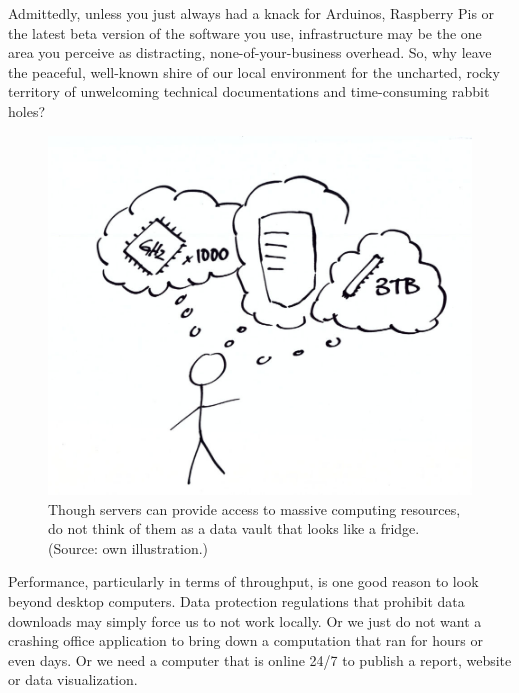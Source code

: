 \documentclass[
  12pt,
  letterpaper,
]{krantz}
\begin{document}
Admittedly, unless you just always had a knack for Arduinos, Raspberry
Pis or the latest beta version of the software you use,
infrastructure may be the one area you perceive as
distracting, none-of-your-business overhead. So, why leave the peaceful,
well-known shire of our local environment for the uncharted, rocky
territory of unwelcoming technical documentations and time-consuming
rabbit holes?

\begin{figure}

{\centering \includegraphics{./images/server-thinking.jpg}

}

\caption{Though servers can provide access to massive computing
resources, do not think of them as a data vault that looks like a
fridge. (Source: own illustration.)}

\end{figure}

Performance, particularly in terms of throughput, is one good reason to
look beyond desktop computers. Data protection regulations that prohibit
data downloads may simply force us to not work locally. Or we just do
not want a crashing office application to bring down a computation that
ran for hours or even days. Or we need a computer that is online 24/7 to
publish a report, website or data visualization.
\end{document}

